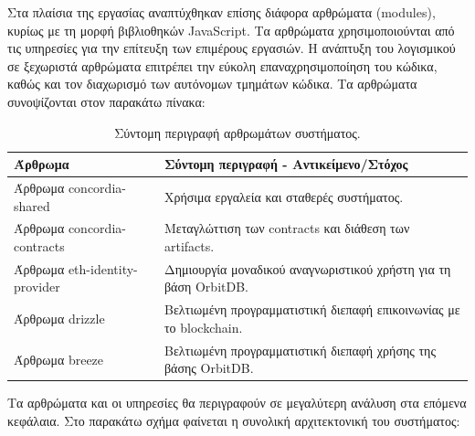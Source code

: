 Στα πλαίσια της εργασίας αναπτύχθηκαν επίσης διάφορα αρθρώματα (modules), κυρίως με τη μορφή βιβλιοθηκών JavaScript. Τα αρθρώματα χρησιμοποιούνται από τις υπηρεσίες για την επίτευξη των επιμέρους εργασιών. Η ανάπτυξη του λογισμικού σε ξεχωριστά αρθρώματα επιτρέπει την εύκολη επαναχρησιμοποίηση του κώδικα, καθώς και τον διαχωρισμό των αυτόνομων τμημάτων κώδικα. Τα αρθρώματα συνοψίζονται στον παρακάτω πίνακα:

\begin{table}[H]
    \begin{center}
        \begin{tabularx}{\textwidth}{l X}
            \toprule
            \textbf{Άρθρωμα} & \textbf{Σύντομη περιγραφή - Αντικείμενο/Στόχος} \\
            \midrule
            Άρθρωμα concordia-shared      & Χρήσιμα εργαλεία και σταθερές συστήματος. \\ [0.5ex]
            Άρθρωμα concordia-contracts   & Μεταγλώττιση των contracts και διάθεση των artifacts. \\ [0.5ex]
            Άρθρωμα eth-identity-provider & Δημιουργία μοναδικού αναγνωριστικού χρήστη για τη βάση OrbitDB. \\ [0.5ex]
            Άρθρωμα drizzle               & Βελτιωμένη προγραμματιστική διεπαφή επικοινωνίας με το blockchain. \\ [0.5ex]
            Άρθρωμα breeze                & Βελτιωμένη προγραμματιστική διεπαφή χρήσης της βάσης OrbitDB. \\ [0.5ex]
            \bottomrule
        \end{tabularx}
    \end{center}
    \caption{Σύντομη περιγραφή αρθρωμάτων συστήματος.}
    \label{table:4-3-software-units-summary}
\end{table}

Τα αρθρώματα και οι υπηρεσίες θα περιγραφούν σε μεγαλύτερη ανάλυση στα επόμενα κεφάλαια. Στο παρακάτω σχήμα φαίνεται η συνολική αρχιτεκτονική του συστήματος:


